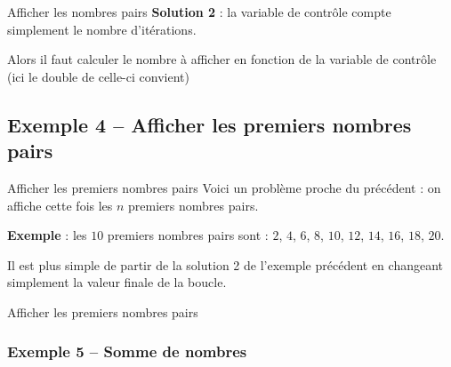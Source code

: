 \begin{frame}{Afficher les nombres pairs}
	\textbf{Solution 2} : 
	la variable de contrôle compte simplement le nombre d'itérations.
	
	Alors il faut calculer le nombre à afficher en fonction de la variable
	de contrôle (ici le double de celle-ci convient)

	\bigskip
	
\end{frame}

\subsection{Exemple 4 -- Afficher les premiers nombres pairs}

\begin{frame}{Afficher les premiers nombres pairs}
	Voici un problème proche du précédent : 
	on affiche cette fois les $n$ premiers nombres pairs.
	
	\bigskip
	
	\textbf{Exemple} : 
	les $10$ premiers nombres pairs sont : $2$, $4$, $6$, $8$, $10$, $12$, $14$, $16$, $18$, $20$.
	
	\bigskip
	
	Il est plus simple de partir de la solution 2 de l'exemple précédent
	en changeant simplement la valeur finale de la boucle.
\end{frame}

\begin{frame}{Afficher les premiers nombres pairs}

\end{frame}

\subsubsection{Exemple 5 -- Somme de nombres}

